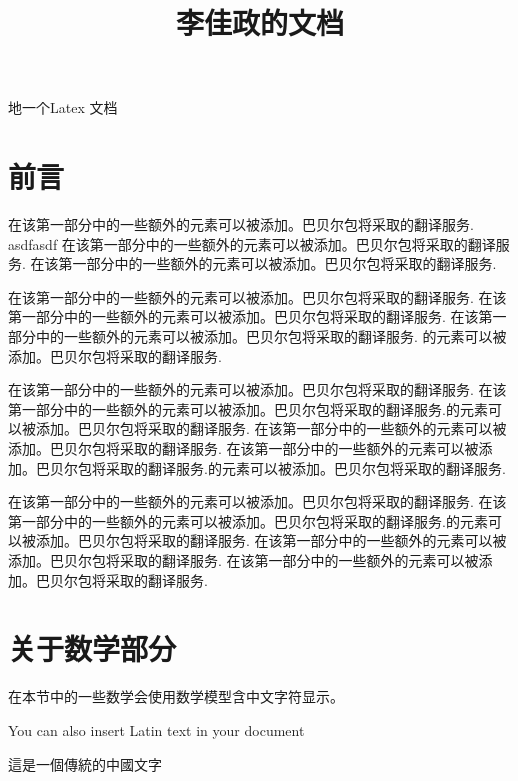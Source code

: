 \documentclass{article}
\begin{document}
\begin{CJK*}{UTF8}{gbsn}
    \title{李佳政的文档}

\begin{titlepage}
    地一个Latex 文档
\end{titlepage}
\section{前言}
在该第一部分中的一些额外的元素可以被添加。巴贝尔包将采取的翻译服务.
asdfasdf\newline
在该第一部分中的一些额外的元素可以被添加。巴贝尔包将采取的翻译服务.
在该第一部分中的一些额外的元素可以被添加。巴贝尔包将采取的翻译服务.

在该第一部分中的一些额外的元素可以被添加。巴贝尔包将采取的翻译服务.
在该第一部分中的一些额外的元素可以被添加。巴贝尔包将采取的翻译服务.
在该第一部分中的一些额外的元素可以被添加。巴贝尔包将采取的翻译服务.
的元素可以被添加。巴贝尔包将采取的翻译服务.\par
在该第一部分中的一些额外的元素可以被添加。巴贝尔包将采取的翻译服务.
在该第一部分中的一些额外的元素可以被添加。巴贝尔包将采取的翻译服务.的元素可以被添加。巴贝尔包将采取的翻译服务.
\newpage
在该第一部分中的一些额外的元素可以被添加。巴贝尔包将采取的翻译服务.
在该第一部分中的一些额外的元素可以被添加。巴贝尔包将采取的翻译服务.的元素可以被添加。巴贝尔包将采取的翻译服务.

在该第一部分中的一些额外的元素可以被添加。巴贝尔包将采取的翻译服务.
在该第一部分中的一些额外的元素可以被添加。巴贝尔包将采取的翻译服务.的元素可以被添加。巴贝尔包将采取的翻译服务.
在该第一部分中的一些额外的元素可以被添加。巴贝尔包将采取的翻译服务.
在该第一部分中的一些额外的元素可以被添加。巴贝尔包将采取的翻译服务.
    
\section{关于数学部分}
在本节中的一些数学会使用数学模型含中文字符显示。
    
\end{CJK*}
    
\vspace{0.5cm} %
    
\noindent
You can also insert Latin text in your document
    
\vspace{0.5cm}
    
\noindent
\begin{CJK*}{UTF8}{bsmi}
這是一個傳統的中國文字
\end{CJK*}
    
\end{document}
